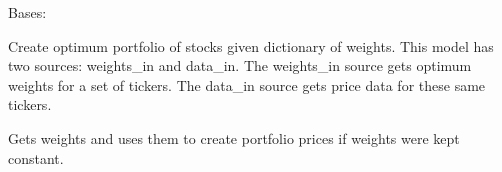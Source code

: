 \documentclass[letterpaper,10pt,english]{sphinxmanual}
\begin{document}

\begin{fulllineitems}
\label{\detokenize{dalio.model:dalio.model.OptimumPortfolio}}
Bases: {\hyperref[\detokenize{dalio.model:dalio.model.model.Model}]{}}

Create optimum portfolio of stocks given dictionary of weights.
This model has two sources: weights\_in and data\_in. The weights\_in source
gets optimum weights for a set of tickers. The data\_in source gets price
data for these same tickers.

\begin{fulllineitems}
\label{\detokenize{dalio.model:dalio.model.OptimumPortfolio.run}}
Gets weights and uses them to create portfolio prices if weights
were kept constant.

\end{fulllineitems}


\end{fulllineitems}

\end{document}
